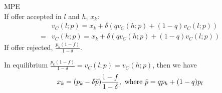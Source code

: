 \documentclass[11pt]{elegantbook}
\begin{document}
MPE\\
If offer accepted in $l$ and $h$, $x_k$:
\begin{equation}
    \begin{aligned}
        &v_C(l;p)=x_k+\delta\left(q v_C(h;p)+(1-q)v_C(l;p)\right)\\
        =&v_C(h;p)=x_k+\delta\left(q v_C(h;p)+(1-q)v_C(l;p)\right)
    \end{aligned}
    \nonumber
\end{equation}
If offer rejected, $\frac{p_k(1-f)}{1-\delta}$.

In equilibrium $\frac{p_k(1-f)}{1-\delta}=v_C(l;p)=v_C(h;p)$, then we have
\begin{equation}
    \begin{aligned}
        x_k=(p_k-\delta\bar{p})\frac{1-f}{1-\delta}, \textnormal{ where }\bar{p}=q p_h + (1-q)p_l
    \end{aligned}
    \nonumber
\end{equation}


\end{document}
